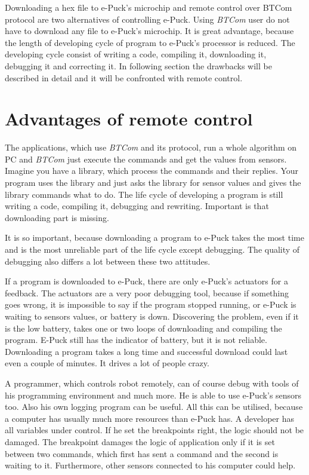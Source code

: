 \documentclass[12pt,notitlepage]{report}
\begin{document}
	Downloading a hex file to e-Puck's microchip and remote control over BTCom protocol are two alternatives
	of controlling e-Puck.
	Using {\it BTCom} user do not have to download any file to e-Puck's microchip.
	It is great advantage, because the length of developing cycle of program to e-Puck's processor is reduced.
	The developing cycle consist of	writing a code, compiling it, downloading it, debugging it and correcting it.
	In following section the drawbacks will be described in detail and it will be confronted with
	remote control.
\section{Advantages of remote control} \label{sec:remote}
	The applications, which use {\it BTCom} and its protocol, run a whole algorithm on PC and {\it BTCom} just 
	execute the commands and get the values from sensors. Imagine you have a library, which process the commands
	and their replies. Your program uses the library and just asks the library for sensor values and
	gives the library commands what to do. The life cycle of developing a program is still writing a code, 
	compiling it, debugging and rewriting. Important is that downloading part is missing.
	 
	It is so important, because downloading a program to e-Puck takes the most time and is the most 
	unreliable part of the life cycle except debugging.
	The quality of debugging also differs a lot between these two attitudes.
	 
	If a program is downloaded to e-Puck, there are only e-Puck's actuators for a feedback.
	The actuators are a very poor debugging tool, because if something goes wrong, 
	it is impossible to say if the program stopped running,
	or e-Puck is waiting to sensors values, or battery is down. 
	Discovering the problem, even if it is the low battery, takes one or two loops of downloading and compiling the program.
	E-Puck still has the indicator of battery, but it is not reliable.
	Downloading a program takes a long time and successful download could last even a couple of minutes. 
	It drives a lot of people crazy.
	 
	A programmer, which controls robot remotely, can of course debug with tools of his programming environment and much more.
	He is able to use e-Puck's sensors too. Also his own logging program can be useful. 
	All this can be utilised, because a computer has usually much more resources than e-Puck has.
	A developer has all variables under control. If he set the breakpoints
	right, the logic should not be damaged. 
	The breakpoint damages the logic of application only if it is set between two commands,
	which first has sent a command and the second is waiting to it.
	Furthermore, other sensors connected to his computer could help.
	
\end{document}
